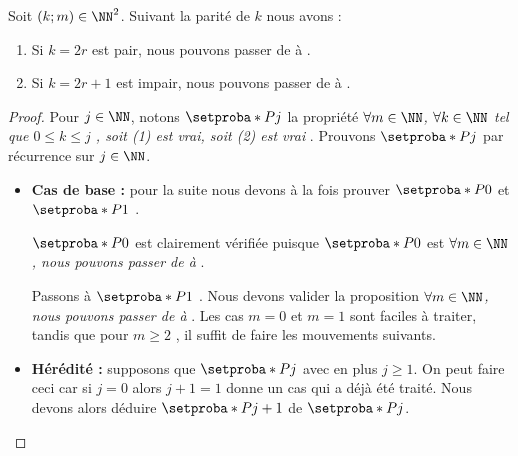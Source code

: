 \begin{fact}
    Soit $(k ; m) \in \NN^2$. Suivant la parité de $k$ nous avons :
    \begin{enumerate}
        \item Si $k = 2r$ est pair, nous pouvons passer de  à  .

        \item Si $k = 2r+1$ est impair, nous pouvons passer de  à  .
    \end{enumerate}
\end{fact}


\begin{proof}
    Pour $j \in \NN$, notons $\setproba*{P}{j}$ la propriété \emph{\og $\forall m \in \NN$, $\forall k \in \NN$ tel que $0 \leq k \leq j$ , soit (1) est vrai, soit (2) est vrai \fg}.
    Prouvons $\setproba*{P}{j}$ par récurrence sur $j \in \NN$.

    \begin{itemize}[label=\small\textbullet]
        \item \textbf{Cas de base :} pour la suite nous devons à la fois prouver $\setproba*{P}{0}$ et $\setproba*{P}{1}$ .

        \noindent
        $\setproba*{P}{0}$ est clairement vérifiée puisque $\setproba*{P}{0}$ est \emph{\og $\forall m \in \NN$, nous pouvons passer de  à  \fg} .

        \noindent
        Passons à $\setproba*{P}{1}$ . Nous devons valider la proposition \emph{\og $\forall m \in \NN$, nous pouvons passer de  à  \fg} .
        Les cas $m = 0$ et $m = 1$ sont faciles à traiter, tandis que pour $m \geq 2$ , il suffit de faire les mouvements suivants.


        \item \textbf{Hérédité :} supposons que $\setproba*{P}{j}$ avec en plus $j \geq 1$. On peut faire ceci car si $j = 0$ alors $j + 1 = 1$ donne un cas qui a déjà été traité. Nous devons alors déduire $\setproba*{P}{j+1}$ de $\setproba*{P}{j}$.


\end{itemize}
\end{proof}
